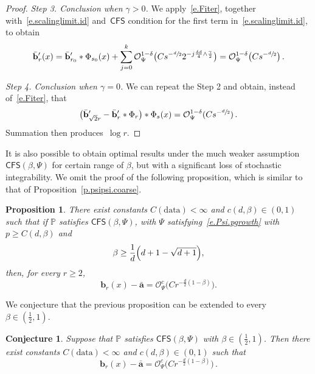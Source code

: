 \documentclass[11pt]{article} %
\numberwithin{equation}{section}
\newtheorem{conjecture}[theorem]{Conjecture}
\newtheorem{proposition}[theorem]{Proposition}
\theoremstyle{definition}
\renewcommand{\b}{\ensuremath{\mathbf{b}}}
\renewcommand{\a}{\mathbf{a}}
\newcommand{\ahom}{\bar{\a}}
\newcommand{\bhom}{\bar{\mathbf{b}}}
\renewcommand{\P}{\mathbb{P}}
\renewcommand{\O}{\mathcal{O}}
\newcommand{\data}{\mathrm{data}}
\newcommand{\CFS}{\mathsf{CFS}}
\begin{document}
\begin{proof}
\smallskip

\emph{Step 3. Conclusion when $\gamma>0$.} We apply~\eqref{e.Fiter}, together with~\eqref{e.scalinglimit.id} and~$\CFS$ condition for the first term in~\eqref{e.scalinglimit.id}, to obtain
\begin{equation*}  
\bhom_{r}' (x)  
=
\bhom_{r_{0}}'  \ast \Phi_{s_{0}}(x)   + \sum_{j=0}^k 
\O_\Psi^{1-\delta}\bigl(C s^{-\sfrac d2} 2^{- j \frac{ \delta d}{4} \wedge \frac{\gamma}{2} } \bigr) 
=
\O_\Psi^{1-\delta}\bigl(C s^{-\sfrac d2} \bigr) 
\,.
\end{equation*}

\smallskip

\emph{Step 4. Conclusion when $\gamma=0$.} We can repeat the Step 2 and obtain, instead of~\eqref{e.Fiter}, that 
\begin{equation}  \label{e.Fiter.gammazero}
\bigl(  \bhom_{\sqrt{2} r}' - \bhom_{r}' \ast \Phi_{r} \bigr) \ast \Phi_{s}(x) 
= 
\O_\Psi^{1-\delta}(C s^{-\sfrac d2}) 
\,.
\end{equation}
Summation then produces~$\log r$. 
\end{proof}

It is also possible to obtain optimal results under the much weaker assumption~$\CFS(\beta,\Psi)$ for certain range of $\beta$, but with a significant loss of stochastic integrability. We omit the proof of the following proposition, which is similar to that of Proposition~\ref{p.psipsi.coarse}.
 
\begin{proposition} 
\label{p.psi.coarse}
There exist constants $C(\data) < \infty$ and $c(d,\beta) \in (0,1)$ such that if $\P$ satisfies $\CFS(\beta,\Psi)$, with $\Psi$ satisfying~\eqref{e.Psi.pgrowth} with~$p\geq C(d,\beta)$ and 
\begin{equation}  \label{e.Psibeta.beta.ass}
\beta \geq \frac{1}{d} \Bigl( d + 1 - \sqrt{d  + 1}  \Bigr), 
\end{equation}
then, for every $r \geq 2$, 
\begin{equation}  \label{e.Psibeta.coarse}
\b_r(x) - \ahom 
= 
\O_{\Psi}^c \bigl( C  r^{-\frac d2(1-\beta)}   \bigr) . 
\end{equation}
\end{proposition}

We conjecture that the previous proposition can be extended to every~$\beta \in (\frac12 ,1 )$.  

\begin{conjecture}
Suppose that $\P$ satisfies $\CFS(\beta,\Psi)$ with $\beta \in (\frac12 ,1 )$. Then there exist constants $C(\data) < \infty$ and $c(d,\beta) \in (0,1)$ such that 
\begin{equation*}
\b_r(x) - \ahom = \O_{\Psi}^c \bigl( C r^{-\frac d2(1-\beta)}  \bigr)\,.
\end{equation*}
\end{conjecture}
\end{document}
